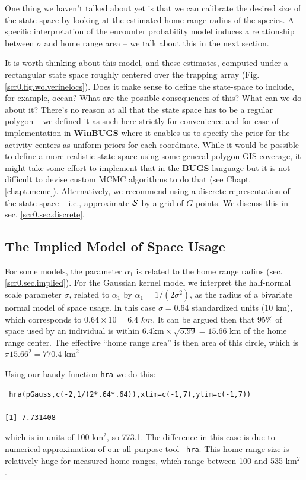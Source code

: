 One thing we haven't talked about yet is that we can calibrate the
desired size of the state-space by looking at the estimated home range
radius of the species. A specific interpretation of the encounter
probability model induces a relationship between $\sigma$ and home
range area -- we talk about this in the next section.

It is worth thinking about this model, and these estimates, computed
under a rectangular state space roughly centered over the trapping
array (Fig. \ref{scr0.fig.wolverinelocs}).  Does it make sense to
define the state-space to include, for example, ocean? What are the
possible consequences of this? What can we do about it?  There's no
reason at all that the state space has to be a regular polygon -- we
defined it as such here strictly for convenience and for ease of
implementation in {\bf WinBUGS} where it enables us to specify the
prior for the activity centers as uniform priors for each coordinate.
While it would be possible to define a more realistic state-space
using some general polygon GIS coverage, it might take some effort to
implement that in the {\bf BUGS} language but it is not difficult to
devise custom MCMC algorithms to do that (see
Chapt. \ref{chapt.mcmc}).  Alternatively, we recommend using a
discrete representation of the state-space -- i.e., approximate ${\cal
  S}$ by a grid of $G$ points. We discuss this in sec.
\ref{scr0.sec.discrete}.

\subsection{The Implied Model of Space Usage}


For some models, the parameter 
 $\alpha_{1}$ is related to the home range radius
 (sec. \ref{scr0.sec.implied}). 
For the Gaussian kernel model we interpret the half-normal scale
parameter $\sigma$, related to $\alpha_1$ by $\alpha_1 =
1/(2\sigma^2)$, as the radius of a bivariate normal model of space usage.
In this case $\sigma = 0.64$ standardized units ($10$ km), which corresponds to
$0.64 \times 10 = 6.4$ $km$.
It can be argued then that 95\% of space used by an individual is
within 
$6.4 \mbox{km} \times \sqrt{5.99}  = 15.66$ km of the home range
center. The effective ``home range area'' is then
area of this circle, which is $\pi 15.66^2 = 770.4$ $\mbox{km}^{2}$

Using our handy function \mbox{\tt hra} we do this:
\begin{verbatim}
 hra(pGauss,c(-2,1/(2*.64*.64)),xlim=c(-1,7),ylim=c(-1,7))

[1] 7.731408
\end{verbatim}
which is in units of 100 km$^2$, so 773.1. The difference in this case
is due to numerical approximation of our all-purpose tool \mbox{\tt
  hra}. 
This home range size is 
relatively huge for measured home ranges, which range between
100 and 535 km$^2$ \citep{whitman_etal:1986}.

